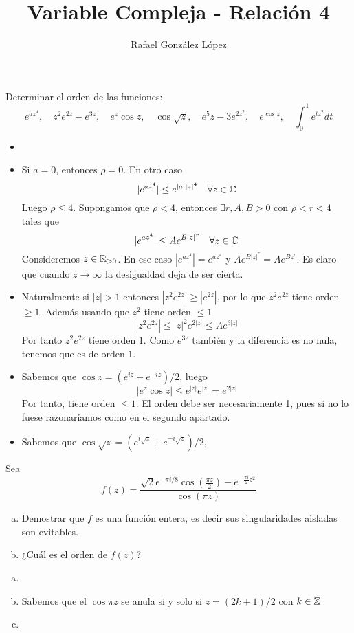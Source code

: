\documentclass[twoside]{article}
\begin{document}
\title{Variable Compleja - Relación 4}
\author{Rafael González López}
\maketitle


\begin{ejercicio}{1}
Determinar el orden de las funciones:
$$
e^{az^4},\quad z^2e^{2z}-e^{3z},\quad e^z \cos z,\quad \cos\sqrt{z}, \quad e^5z-3e^{2z^2}, \quad e^{\cos z},\quad \int_0^1 e^{tz^2}dt
$$
\end{ejercicio}
\begin{solucion}
\begin{itemize}
\item[]
\item Si $a=0$, entonces $\rho=0$. En otro caso
$$
|e^{az^4}|\leq e^{|a||z|^4} \quad \forall z \in \mathbb{C}
$$
Luego $\rho\leq 4$. Supongamos que $\rho <4$, entonces $\exists r,A,B>0$ con $\rho<r<4$ tales que
$$
|e^{az^4}|\leq Ae^{B|z|^r} \quad \forall z \in \mathbb{C}
$$
Consideremos $z\in \mathbb{R}_{>0}$. En ese caso $|e^{az^4}|=e^{az^4}$ y $ Ae^{B|z|^r} = Ae^{Bz^r}$. Es claro que cuando $z\to \infty$ la desigualdad deja de ser cierta.
\item Naturalmente si $|z|>1$ entonces $|z^2e^{2z}|\geq |e^{2z}|$, por lo que $z^2e^{2z}$ tiene orden $\geq 1$. Además usando que $z^2$ tiene orden $\leq 1$
$$
|z^2e^{2z}|\leq |z|^2e^{2|z|}\leq Ae^{3|z|}
$$
Por tanto $z^2e^{2z}$ tiene orden $1$. Como $e^{3z}$ también y la diferencia es no nula, tenemos que es de orden $1$.
\item Sabemos que $\cos z = (e^{iz}+e^{-iz})/2$, luego
$$
|e^z \cos z| \leq e^{|z|}e^{|z|} = e^{2|z|}
$$
Por tanto, tiene orden $\leq 1$. El orden debe ser necesariamente 1, pues si no lo fuese razonaríamos como en el segundo apartado.
\item Sabemos que $\cos \sqrt{z} = (e^{i\sqrt{z}}+e^{-i\sqrt{z}})/2$,
\end{itemize}
\end{solucion}

\newpage

\begin{ejercicio}{2}
Sea
$$
f(z)=\frac{\sqrt{2}e^{-\pi i/8}\cos\left(\frac{\pi z}{2}\right)-e^{-\frac{\pi i}{2}z^2}}{\cos(\pi z)}
$$
\begin{enumerate}[(a)]
\item Demostrar que $f$ es una función entera, es decir sus singularidades aisladas son evitables.
\item ¿Cuál es el orden de $f(z)$?
\end{enumerate}
\end{ejercicio}
\begin{solucion}
\begin{enumerate}[(a)]
\item[]
\item Sabemos que el $\cos \pi z$ se anula si y solo si $z=(2k+1)/2$ con $k\in \mathbb{Z}$
\item 
\end{enumerate}
\end{solucion}
\end{document}
